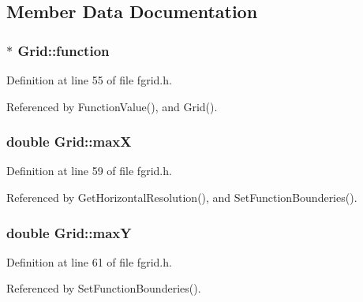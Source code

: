 \subsection{Member Data Documentation}
\subsubsection[{\texorpdfstring{function}{function}}]{$\ast$ Grid\+::function\hspace{0.3cm}{\ttfamily [private]}}\hypertarget{classGrid_a69d704fb7924b50175b937798fe6d67d}{}\label{classGrid_a69d704fb7924b50175b937798fe6d67d}


Definition at line 55 of file fgrid.\+h.



Referenced by Function\+Value(), and Grid().

\subsubsection[{\texorpdfstring{maxX}{maxX}}]{\setlength{\rightskip}{0pt plus 5cm}double Grid\+::maxX\hspace{0.3cm}{\ttfamily [private]}}\hypertarget{classGrid_ad093fee95a663d4b82c85bea9a1241ec}{}\label{classGrid_ad093fee95a663d4b82c85bea9a1241ec}


Definition at line 59 of file fgrid.\+h.



Referenced by Get\+Horizontal\+Resolution(), and Set\+Function\+Bounderies().

\subsubsection[{\texorpdfstring{maxY}{maxY}}]{\setlength{\rightskip}{0pt plus 5cm}double Grid\+::maxY\hspace{0.3cm}{\ttfamily [private]}}\hypertarget{classGrid_acca4c514021d9f6733579b699ac68436}{}\label{classGrid_acca4c514021d9f6733579b699ac68436}


Definition at line 61 of file fgrid.\+h.



Referenced by Set\+Function\+Bounderies().

